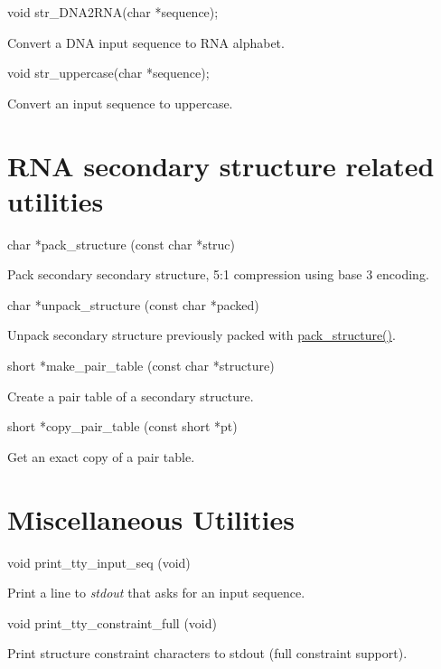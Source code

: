 \begin{DoxyVerb}
void str_DNA2RNA(char *sequence);
\end{DoxyVerb}
 Convert a DNA input sequence to RNA alphabet. 

\begin{DoxyVerb}
void str_uppercase(char *sequence);
\end{DoxyVerb}
 Convert an input sequence to uppercase. 

\hypertarget{mp__utils_utils_struc}{}\section{RNA secondary structure related utilities}\label{mp__utils_utils_struc}
\begin{DoxyVerb}
char *pack_structure (const char *struc)
\end{DoxyVerb}
 Pack secondary secondary structure, 5:1 compression using base 3 encoding. 

\begin{DoxyVerb}
char *unpack_structure (const char *packed)
\end{DoxyVerb}
 Unpack secondary structure previously packed with \hyperlink{utils_8h_ac6dfa5e22928c087c6e09ff0054a7ced}{pack\_\-structure()}. 

\begin{DoxyVerb}
short *make_pair_table (const char *structure)
\end{DoxyVerb}
 Create a pair table of a secondary structure. 

\begin{DoxyVerb}
short *copy_pair_table (const short *pt)
\end{DoxyVerb}
 Get an exact copy of a pair table. 

\hypertarget{mp__utils_utils_misc}{}\section{Miscellaneous Utilities}\label{mp__utils_utils_misc}
\begin{DoxyVerb}
void print_tty_input_seq (void)
\end{DoxyVerb}
 Print a line to {\itshape stdout\/} that asks for an input sequence. 

\begin{DoxyVerb}
void print_tty_constraint_full (void)
\end{DoxyVerb}
 Print structure constraint characters to stdout (full constraint support). 

